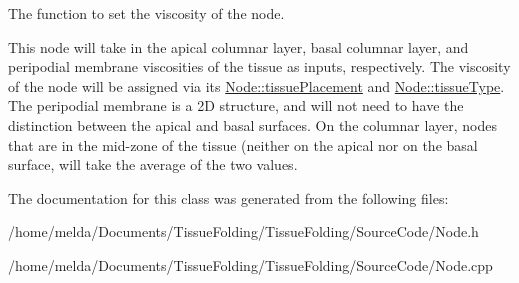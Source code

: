 The function to set the viscosity of the node. 

This node will take in the apical columnar layer, basal columnar layer, and peripodial membrane viscosities of the tissue as inputs, respectively. The viscosity of the node will be assigned via its \hyperlink{classNode_af754322e3928dc45f70b19762551890a}{Node\+::tissue\+Placement} and \hyperlink{classNode_ae621097f98f1d33d283cf65a0a02d29a}{Node\+::tissue\+Type}. The peripodial membrane is a 2\+D structure, and will not need to have the distinction between the apical and basal surfaces. On the columnar layer, nodes that are in the mid-\/zone of the tissue (neither on the apical nor on the basal surface, will take the average of the two values.

The documentation for this class was generated from the following files\+:\begin{DoxyCompactItemize}
\item 
/home/melda/\+Documents/\+Tissue\+Folding/\+Tissue\+Folding/\+Source\+Code/Node.\+h\item 
/home/melda/\+Documents/\+Tissue\+Folding/\+Tissue\+Folding/\+Source\+Code/Node.\+cpp\end{DoxyCompactItemize}
